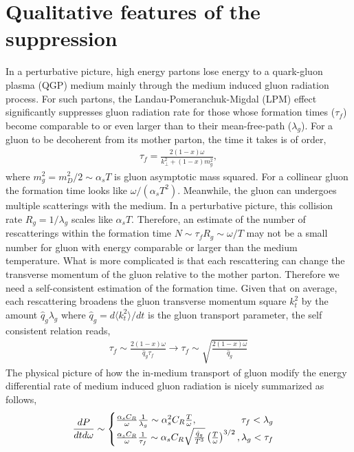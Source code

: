 \documentclass[aps, prc, reprint, amsmath, groupedaddress, nofootinbib]{revtex4-1}
\begin{document}
\section{Qualitative features of the suppression}\label{section:qual}
In a perturbative picture, high energy partons lose energy to a quark-gluon plasma (QGP) medium mainly through the medium induced gluon radiation process.
For such partons, the Landau-Pomeranchuk-Migdal (LPM) effect significantly suppresses gluon radiation rate for those whose formation times ($\tau_f$) become comparable to or even larger than to their mean-free-path ($\lambda_g$).
For a gluon to be decoherent from its mother parton, the time it takes is of order,
\begin{eqnarray}\label{eq:tau_1}
\tau_f = \frac{2(1-x)\omega}{k_\perp^2+(1-x)m_g^2},
\end{eqnarray}
where $m_g^2=m_D^2/2 \sim \alpha_s T$ is gluon asymptotic mass squared.
For a collinear gluon the formation time looks like $\omega/(\alpha_s T^2)$.
Meanwhile, the gluon can undergoes multiple scatterings with the medium.
In a perturbative picture, this collision rate $R_{g} = 1/\lambda_g$ scales like $\alpha_s T$. 
Therefore, an estimate of the number of rescatterings within the formation time $N \sim \tau_f R_g \sim \omega/T$ may not be a small number for gluon with energy comparable or larger than the medium temperature.
What is more complicated is that each rescattering can change the transverse momentum of the gluon relative to the mother parton.
Therefore we need a self-consistent estimation of the formation time.
Given that on average, each rescattering broadens the gluon transverse momentum square $k_t^2$ by the amount $\hat{q}_g\lambda_g$ where $\hat{q}_g = d\langle k_t^2\rangle/dt$ is the gluon transport parameter, the self consistent relation reads,
\begin{eqnarray}\label{eq:tau_n}
\tau_f \sim \frac{2(1-x)\omega}{\hat{q}_g\tau_f} \longrightarrow \tau_f \sim \sqrt{\frac{2(1-x)\omega}{\hat{q}_g}}
\end{eqnarray}
The physical picture of how the in-medium transport of gluon modify the energy differential rate of medium induced gluon radiation is nicely summarized as follows,
\begin{eqnarray}\label{eq:LPM}
\frac{dP}{dt d\omega} \sim \begin{cases}
 \frac{\alpha_s C_R}{\omega} \frac{1}{\lambda_g} \sim \alpha_s^2 C_R \frac{T}{\omega}, \hfill \tau_f < \lambda_g\\
 \frac{\alpha_s C_R}{\omega} \frac{1}{\tau_f}\sim \alpha_s C_R \sqrt{\frac{\hat{q}_g}{T^3}} \left(\frac{T}{\omega}\right)^{3/2}, \hfill \lambda_g < \tau_f
\end{cases}
\end{eqnarray}
\end{document}
